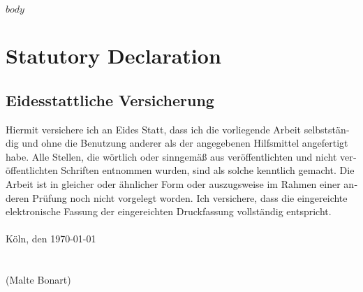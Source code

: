 \documentclass[a4paper, bibtotocnumbered,liststotoc,12pt]{scrartcl}
\theoremstyle{definition}
\theoremstyle{remark}
\numberwithin{figure}{section}
\numberwithin{table}{section}
\numberwithin{equation}{section}
\begin{document}

$body$


\newpage
\printbibliography




\newpage
\thispagestyle{plain}
\section{Statutory Declaration}


\begin{otherlanguage}{ngerman}
	
	\section*{Eidesstattliche Versicherung}
	
	 Hiermit versichere ich an Eides Statt, dass ich die vorliegende Arbeit selbstständig und ohne die Benutzung anderer als der angegebenen Hilfsmittel angefertigt habe. Alle Stellen, die wörtlich oder sinngemäß aus veröffentlichten und nicht veröffentlichten Schriften entnommen wurden, sind als solche kenntlich gemacht. Die Arbeit ist in gleicher oder ähnlicher Form oder auszugsweise im Rahmen einer anderen Prüfung noch nicht vorgelegt worden. Ich versichere, dass die eingereichte elektronische Fassung der eingereichten Druckfassung vollständig entspricht. \\
	\\
	K\"oln, den \today
	\\
	\\
	\\
	(Malte Bonart)
\end{otherlanguage}


%
%
\end{document}
